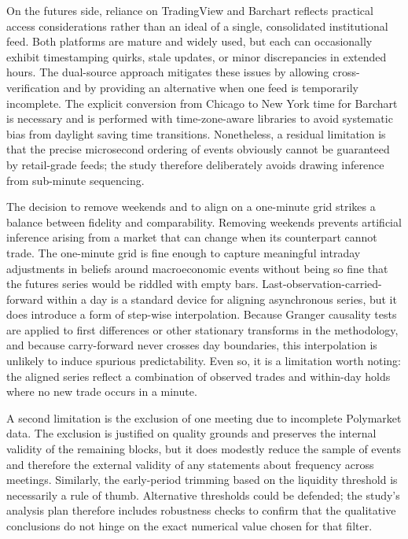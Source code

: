 On the futures side, reliance on TradingView and Barchart reflects practical access considerations rather than an ideal of a single, consolidated institutional feed. Both platforms are mature and widely used, but each can occasionally exhibit timestamping quirks, stale updates, or minor discrepancies in extended hours. The dual-source approach mitigates these issues by allowing cross-verification and by providing an alternative when one feed is temporarily incomplete. The explicit conversion from Chicago to New York time for Barchart is necessary and is performed with time-zone-aware libraries to avoid systematic bias from daylight saving time transitions. Nonetheless, a residual limitation is that the precise microsecond ordering of events obviously cannot be guaranteed by retail-grade feeds; the study therefore deliberately avoids drawing inference from sub-minute sequencing.

The decision to remove weekends and to align on a one-minute grid strikes a balance between fidelity and comparability. Removing weekends prevents artificial inference arising from a market that can change when its counterpart cannot trade. The one-minute grid is fine enough to capture meaningful intraday adjustments in beliefs around macroeconomic events without being so fine that the futures series would be riddled with empty bars. Last-observation-carried-forward within a day is a standard device for aligning asynchronous series, but it does introduce a form of step-wise interpolation. Because Granger causality tests are applied to first differences or other stationary transforms in the methodology, and because carry-forward never crosses day boundaries, this interpolation is unlikely to induce spurious predictability. Even so, it is a limitation worth noting: the aligned series reflect a combination of observed trades and within-day holds where no new trade occurs in a minute.

A second limitation is the exclusion of one meeting due to incomplete Polymarket data. The exclusion is justified on quality grounds and preserves the internal validity of the remaining blocks, but it does modestly reduce the sample of events and therefore the external validity of any statements about frequency across meetings. Similarly, the early-period trimming based on the liquidity threshold is necessarily a rule of thumb. Alternative thresholds could be defended; the study’s analysis plan therefore includes robustness checks to confirm that the qualitative conclusions do not hinge on the exact numerical value chosen for that filter.

